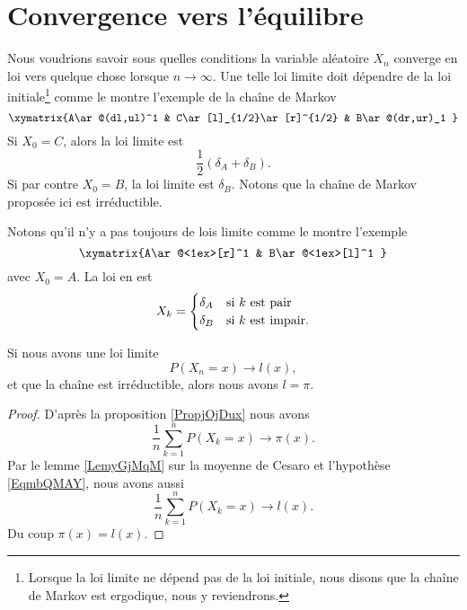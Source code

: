 \section{Convergence vers l'équilibre}

Nous voudrions savoir sous quelles conditions la variable aléatoire \( X_n\) converge en loi vers quelque chose lorsque \( n\to \infty\). Une telle loi limite doit dépendre de la loi initiale\footnote{Lorsque la loi limite ne dépend pas de la loi initiale, nous disons que la chaîne de Markov est ergodique, nous y reviendrons.} comme le montre l'exemple de la chaîne de Markov
\begin{equation}
\xymatrix{%
A\ar@(dl,ul)^1  & C\ar[l]_{1/2}\ar[r]^{1/2} &  B\ar@(dr,ur)_1
   }
\end{equation}
Si \( X_0=C\), alors la loi limite est
\begin{equation}
    \frac{ 1 }{2}(\delta_A+\delta_B).
\end{equation}
Si par contre \( X_0=B\), la loi limite est \(\delta_B\). Notons que la chaîne de Markov proposée ici est irréductible.

Notons qu'il n'y a pas toujours de lois limite comme le montre l'exemple
\begin{equation}
    \xymatrix{%
        A\ar@<1ex>[r]^1  & B\ar@<1ex>[l]^1
       }
\end{equation}
avec \( X_0=A\). La loi en est
\begin{equation}
    X_k=\begin{cases}
        \delta_A    &   \text{si \( k\) est pair}\\
        \delta_B    &    \text{si \( k\) est impair}.
    \end{cases}
\end{equation}

\begin{lemma}
    Si nous avons une loi limite
    \begin{equation}    \label{EqmbQMAY}
        P(X_n=x)\to l(x),
    \end{equation}
    et que la chaîne est irréductible, alors nous avons \( l=\pi\).
\end{lemma}

\begin{proof}
    D'après la proposition \ref{PropjOjDux} nous avons
    \begin{equation}
        \frac{1}{ n }\sum_{k=1}^nP(X_k=x)\to \pi(x).
    \end{equation}
    Par le lemme \ref{LemyGjMqM} sur la moyenne de Cesaro et l'hypothèse \eqref{EqmbQMAY}, nous avons aussi
    \begin{equation}
        \frac{1}{ n }\sum_{k=1}^nP(X_k=x)\to l(x).
    \end{equation}
    Du coup \( \pi(x)=l(x)\).
\end{proof}

